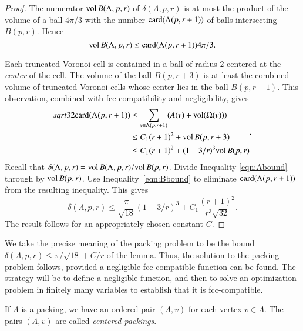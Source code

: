 \begin{proof}
The numerator ${\operatorname{vol}}\, B(\Lambda,p,r)$ of $\delta(\Lambda,p,r)$
is at most the product of the volume of a ball $4\pi/3$ with the
number ${\operatorname{card}}(\Lambda(p,r+1))$ of balls intersecting $B(p,r)$.  Hence
    \begin{equation}
    {\operatorname{vol}}\, B(\Lambda,p,r) \le {\operatorname{card}}(\Lambda(p,r+1)) 4\pi/3.
    \label{eqn:Abound}
    \end{equation}

Each truncated Voronoi cell is contained in a ball of
radius $2$ centered at the {\it center} of the cell.  The volume
of the ball $B(p,r+3)$ is at least the combined volume of 
truncated Voronoi
cells whose center lies in the ball $B(p,r+1)$. This observation,
combined with fcc-compatibility and negligibility, gives
    \begin{equation}
    \begin{split}
    sqrt{32}{\operatorname{card}}(\Lambda(p,r+1))
    &\le \sum_{v\in\Lambda(p,r+1)} (A(v) +
    {\operatorname{vol}}(\Omega(v))) \\
    &\le C_1 (r+1)^2 + {\operatorname{vol}}\,B(p,r+3) \\
    &\le C_1 (r+1)^2 + (1+3/r)^3 {\operatorname{vol}}\,B(p,r)
    \label{eqn:Bbound}
    \end{split}.
    \end{equation}
Recall that $\delta(\Lambda,p,r)=
{\operatorname{vol}}\,B(\Lambda,p,r)/{\operatorname{vol}}\,B(p,r)$. Divide Inequality
\ref{eqn:Abound} through by ${\operatorname{vol}}\,B(p,r)$.  Use
Inequality~\ref{eqn:Bbound} to eliminate ${\operatorname{card}}(\Lambda(p,r+1))$ from the
resulting inequality.  This gives
    $$\delta(\Lambda,p,r)
        \le \frac{\pi}{\sqrt{18}} (1+3/r)^3 + C_1 \frac{(r+1)^2}{r^3\sqrt{32}}.
    $$
The result follows for an appropriately chosen constant $C$.
\end{proof}

\begin{remark} \label{remark:precise}
We take the precise meaning of the packing problem to be the
bound $\delta(\Lambda,p,r) \le \pi/\sqrt{18} + C/r$ of the lemma.
Thus, the solution to the packing problem follows, provided a negligible
fcc-compatible function can be found. The strategy will be to
define a negligible function, and then to solve an optimization
problem in finitely many variables to establish that it is
fcc-compatible.
\end{remark}

If $\Lambda$ is a %
packing, we have an ordered pair $(\Lambda,v)$ for each vertex $v\in\Lambda$.  The pairs $(\Lambda,v)$ are called {\it centered packings}.



